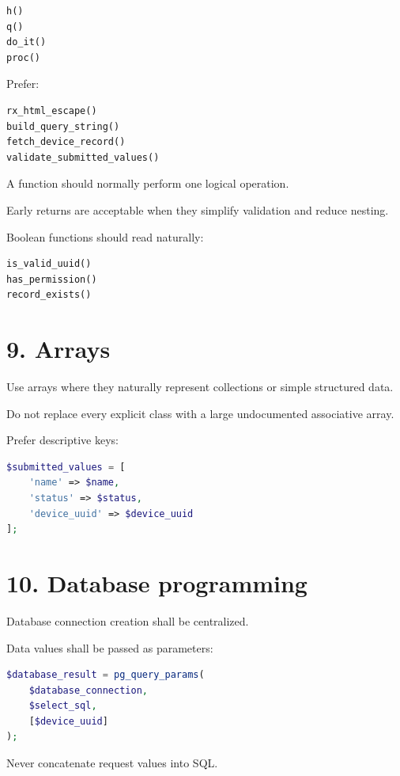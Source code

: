 \documentclass[11pt,a4paper]{article}
\begin{document}
\begin{lstlisting}[language=PHP]
h()
q()
do_it()
proc()
\end{lstlisting}

Prefer:

\begin{lstlisting}[language=PHP]
rx_html_escape()
build_query_string()
fetch_device_record()
validate_submitted_values()
\end{lstlisting}

A function should normally perform one logical operation.

Early returns are acceptable when they simplify validation and reduce
nesting.

Boolean functions should read naturally:

\begin{lstlisting}[language=PHP]
is_valid_uuid()
has_permission()
record_exists()
\end{lstlisting}

\section{9. Arrays}\label{9-arrays}

Use arrays where they naturally represent collections or simple
structured data.

Do not replace every explicit class with a large undocumented
associative array.

Prefer descriptive keys:

\begin{lstlisting}[language=PHP]
$submitted_values = [
    'name' => $name,
    'status' => $status,
    'device_uuid' => $device_uuid
];
\end{lstlisting}

\section{10. Database programming}\label{10-database-programming}

Database connection creation shall be centralized.

Data values shall be passed as parameters:

\begin{lstlisting}[language=PHP]
$database_result = pg_query_params(
    $database_connection,
    $select_sql,
    [$device_uuid]
);
\end{lstlisting}

Never concatenate request values into SQL.
\end{document}
